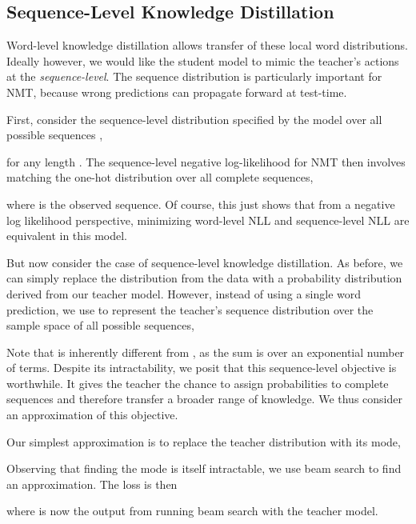\documentclass[11pt,letterpaper]{article}
\begin{document}
\subsection{Sequence-Level Knowledge Distillation}

Word-level knowledge distillation allows transfer of these local word
distributions. Ideally however, we would like the student model to mimic the
teacher's actions at the \textit{sequence-level}.  The sequence
distribution is particularly important for NMT, because wrong
predictions can propagate forward at test-time.

First, consider the sequence-level distribution specified by the model over all
possible sequences ,

for any length .
The sequence-level negative log-likelihood for NMT then involves matching
the one-hot distribution over all complete sequences,

where  is the observed sequence.
Of course, this just shows that from a negative log likelihood perspective,
 minimizing word-level NLL and sequence-level NLL are equivalent in this model.


But now consider the case of sequence-level knowledge distillation.  
As before, we
can simply replace the distribution from the data with a probability
distribution derived from our teacher model.
However, instead of using
a single word prediction, we use  to represent
the teacher's sequence distribution over the sample space of
all possible sequences,

Note that  is inherently different from , as the sum is over an
exponential  number of terms. Despite its intractability, we posit that this sequence-level
objective is worthwhile. It gives the teacher the chance to
assign probabilities to complete sequences and therefore transfer a
broader range of knowledge. We thus consider an approximation of this
objective.

Our simplest approximation is to replace the teacher
distribution  with its mode,

Observing that finding the mode is itself intractable, we use beam search 
to find an approximation. The loss is then

where  is now the output from running beam search with the teacher model.
\end{document}
